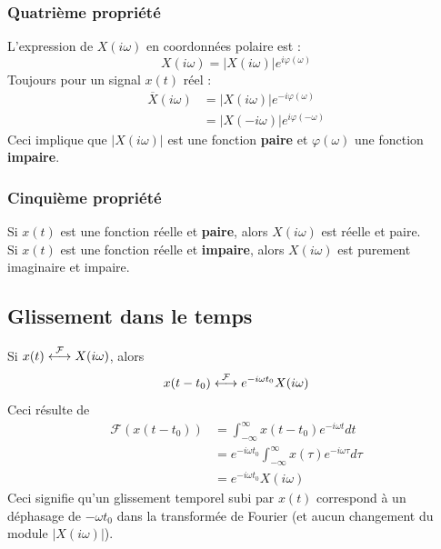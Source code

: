 	
\subsubsection{Quatrième propriété}
L'expression de $X(i\omega)$ en coordonnées polaire est : 
\begin{equation}
	X(i\omega) = |X(i\omega)|e^{i\varphi(\omega)}
\end{equation}
Toujours pour un signal $x(t)$ réel :
\begin{equation}
	\begin{array}{ll}
		\overline{X}(i\omega) & = |X(i\omega)|e^{-i\varphi(\omega)}  \\
		                      & = |X(-i\omega)|e^{i\varphi(-\omega)} 
	\end{array}
\end{equation}
Ceci implique que $|X(i\omega)|$ est une fonction \textbf{paire} 
et $\varphi(\omega)$ une fonction \textbf{impaire}.
		
	
\subsubsection{Cinquième propriété}
Si $x(t)$ est une fonction réelle et \textbf{paire}, alors $X(i
\omega)$ est réelle et paire.\\
Si $x(t)$ est une fonction réelle et \textbf{impaire}, alors 
$X(i\omega)$ est purement imaginaire et impaire.
		
\subsection{Glissement dans le temps}
Si $x(t) \ft X(i\omega)$, alors 
\begin{equation}
	x(t-t_0) \ft e^{-i\omega t_0}X(i\omega)
\end{equation}
Ceci résulte de 
\begin{equation}
	\begin{array}{ll}
		\mathcal{F}(x(t-t_0)) & = \int_{-\infty}^\infty x(t-t_0)e^{-i\omega t}dt                      \\
		                      & = e^{-i\omega t_0} \int_{-\infty}^\infty x(\tau)e^{-i\omega\tau}d\tau \\
		                      & = e^{-i\omega t_0}X(i\omega)                                          
	\end{array}
\end{equation}
Ceci signifie qu'un glissement temporel subi par $x(t)$ correspond à un 
déphasage de $-\omega t_0$ dans la transformée de Fourier (et aucun 
changement du module $|X(i\omega)|$).
	
